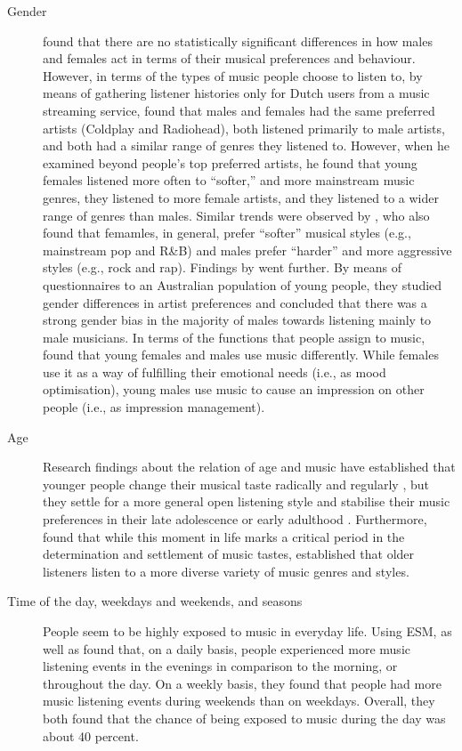 \begin{description}
\item[Gender] \textcite{baur11thesis} found that there are no statistically significant differences in how males and females act in terms of their musical preferences and behaviour.
However, in terms of the types of music people choose to listen to, by means of gathering listener histories only for  Dutch users from a music streaming service, \textcite{berkers10gendered} found that males and females had the same preferred artists (Coldplay and Radiohead), both listened primarily to male artists, and both had a similar range of genres they listened to. However, when he examined beyond people's top preferred artists, he found that young females listened more often to ``softer,'' and more mainstream music genres, they listened to more female artists, and they listened to a wider range of genres than males. 
Similar trends were observed by \textcite{north08musical}, who also found that femamles, in general, prefer ``softer'' musical styles (e.g., mainstream pop and R\&B) and males prefer ``harder'' and more aggressive styles (e.g., rock and rap). 
Findings by \textcite{millar08selective} went further. By means of questionnaires to an Australian population of young people, they studied gender differences in artist preferences and concluded that there was a strong gender bias in the majority of males towards listening mainly to male musicians.
In terms of the functions that people assign to music, \textcite{north00importance} found that young females and males use music differently. While females use it as a way of fulfilling their emotional needs (i.e., as mood optimisation), young males use music to cause an impression on other people (i.e., as impression management).


\item[Age] Research findings about the relation of age and music have established that younger people change their musical taste radically and regularly \autocite{hargreaves95effects}, but they settle for a more general open listening style and stabilise their music preferences in their late adolescence or early adulthood \autocite{sease09musical}. 
Furthermore, \textcite{north02age} found that while this moment in life marks a critical period in the determination and settlement of music tastes, \textcite{baur11thesis} established that older listeners listen to a more diverse variety of music genres and styles.

\item[Time of the day, weekdays and weekends, and seasons] People seem to be highly exposed to music in everyday life. Using ESM, \textcite{sloboda01functions} as well as \textcite{north04uses} found that, on a daily basis, people experienced more music listening events in the evenings in comparison to the morning, or throughout the day. On a weekly basis, they found that people had more music listening events during weekends than on weekdays. Overall, they both found that the chance of being exposed to music during the day was about 40 percent.


\end{description}

